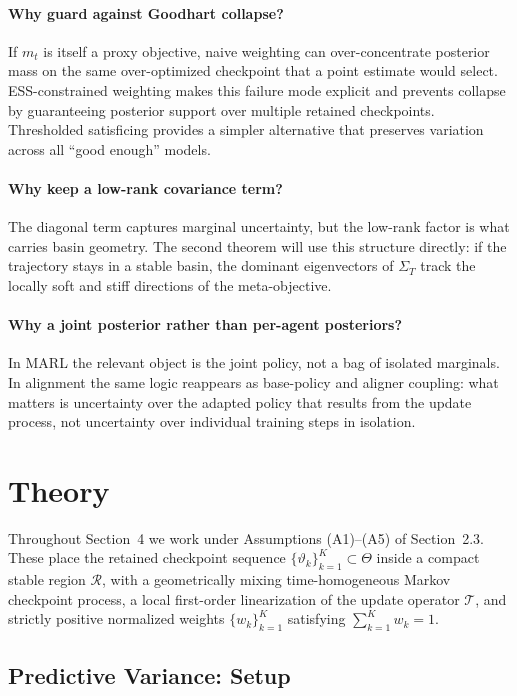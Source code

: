 \documentclass[10pt]{article}
\theoremstyle{plain}
\theoremstyle{definition}
\theoremstyle{remark}
\begin{document}
\paragraph{Why guard against Goodhart collapse?}
If $m_t$ is itself a proxy objective, naive weighting can over-concentrate posterior mass on the same over-optimized checkpoint that a point estimate would select. ESS-constrained weighting makes this failure mode explicit and prevents collapse by guaranteeing posterior support over multiple retained checkpoints. Thresholded satisficing provides a simpler alternative that preserves variation across all ``good enough'' models.

\paragraph{Why keep a low-rank covariance term?}
The diagonal term captures marginal uncertainty, but the low-rank factor is what carries basin geometry. The second theorem will use this structure directly: if the trajectory stays in a stable basin, the dominant eigenvectors of $\Sigma_T$ track the locally soft and stiff directions of the meta-objective.

\paragraph{Why a joint posterior rather than per-agent posteriors?}
In MARL the relevant object is the joint policy, not a bag of isolated marginals. In alignment the same logic reappears as base-policy and aligner coupling: what matters is uncertainty over the adapted policy that results from the update process, not uncertainty over individual training steps in isolation.

\section{Theory}

Throughout Section~4 we work under Assumptions (A1)--(A5) of Section~2.3. These place the retained checkpoint sequence $\{\vartheta_k\}_{k=1}^K \subset \Theta$ inside a compact stable region $\mathcal{R}$, with a geometrically mixing time-homogeneous Markov checkpoint process, a local first-order linearization of the update operator $\mathcal{T}$, and strictly positive normalized weights $\{w_k\}_{k=1}^K$ satisfying $\sum_{k=1}^K w_k = 1$.

\subsection{Predictive Variance: Setup}\label{sec:predvar-setup}
\end{document}
